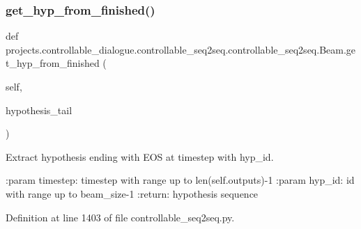 \subsubsection{\texorpdfstring{get\+\_\+hyp\+\_\+from\+\_\+finished()}{get\_hyp\_from\_finished()}}
{\footnotesize\ttfamily def projects.\+controllable\+\_\+dialogue.\+controllable\+\_\+seq2seq.\+controllable\+\_\+seq2seq.\+Beam.\+get\+\_\+hyp\+\_\+from\+\_\+finished (\begin{DoxyParamCaption}\item[{}]{self,  }\item[{}]{hypothesis\+\_\+tail }\end{DoxyParamCaption})}

\begin{DoxyVerb}Extract hypothesis ending with EOS at timestep with hyp_id.

:param timestep:
    timestep with range up to len(self.outputs)-1
:param hyp_id:
    id with range up to beam_size-1
:return:
    hypothesis sequence
\end{DoxyVerb}
 

Definition at line 1403 of file controllable\+\_\+seq2seq.\+py.


